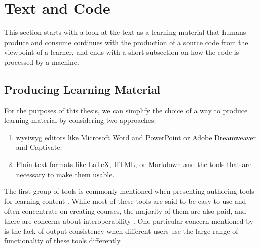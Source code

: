 \section{Text and Code}
\label{sec:text-code}

This section starts with a look at the text as a learning material that humans produce and consume continues with the production of a source code from the viewpoint of a learner, and ends with a short subsection on how the code is processed by a machine.

\subsection{Producing Learning Material}

For the purposes of this thesis, we can simplify the choice of a way to produce learning material by considering two approaches:

\begin{enumerate}
    \item \gls{wysiwyg} editors like Microsoft Word and PowerPoint or Adobe Dreamweaver and Captivate.
    \item Plain text formats like \LaTeX, HTML, or Markdown and the tools that are necessary to make them usable.
\end{enumerate}

The first group of tools is commonly mentioned when presenting authoring tools for learning content \parencite{khademi_review_nodate}.
While most of these tools are said to be easy to use and often concentrate on creating courses, the majority of them are also paid, and there are concerns about interoperability \parencites{khademi_review_nodate}{shieber_why_2014}.
One particular concern mentioned by \textcite{shieber_why_2014} is the lack of output consistency when different users use the large range of functionality of these tools differently.

